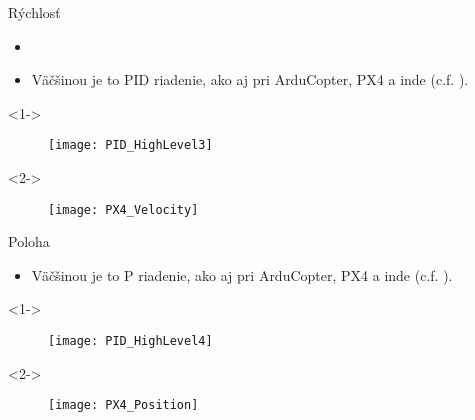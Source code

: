   \begin{frame}[t]{Rýchlosť}
\begin{itemize}
  \item<1->   \item<1-> Väčšinou je to PID riadenie, ako aj pri ArduCopter, PX4 a inde (c.f. \cite{Saha2020}).
\end{itemize}

  \begin{onlyenv}<1->
  \begin{figure}
\centering
  \texttt{[image: PID\_HighLevel3]}\\
\end{figure}
\end{onlyenv}


  \begin{onlyenv}<2->
  \begin{figure}
\centering
  \texttt{[image: PX4\_Velocity]}\\
\end{figure}
\end{onlyenv}

  \end{frame}


 \begin{frame}[t]{Poloha}
\begin{itemize}
  \item<1-> Väčšinou je to P riadenie, ako aj pri ArduCopter, PX4 a inde (c.f. \cite{Saha2020}).
\end{itemize}

  \begin{onlyenv}<1->
  \begin{figure}
\centering
  \texttt{[image: PID\_HighLevel4]}\\
\end{figure}
\end{onlyenv}


  \begin{onlyenv}<2->
  \begin{figure}
\centering
  \texttt{[image: PX4\_Position]}\\
\end{figure}
\end{onlyenv}
  \end{frame}




